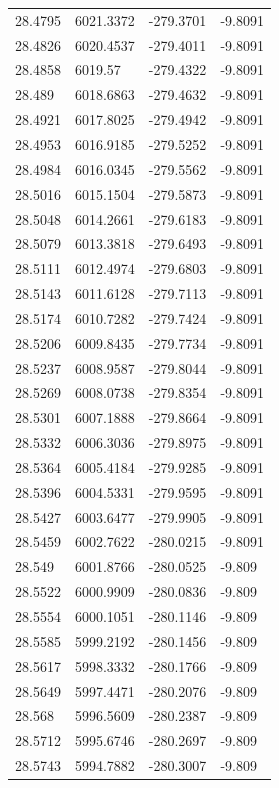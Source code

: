 \begin{table}[H]
\begin{tabular}{llll}
28.4795 & 6021.3372 & -279.3701 & -9.8091 \\
28.4826 & 6020.4537 & -279.4011 & -9.8091 \\
28.4858 & 6019.57 & -279.4322 & -9.8091 \\
28.489 & 6018.6863 & -279.4632 & -9.8091 \\
28.4921 & 6017.8025 & -279.4942 & -9.8091 \\
28.4953 & 6016.9185 & -279.5252 & -9.8091 \\
28.4984 & 6016.0345 & -279.5562 & -9.8091 \\
28.5016 & 6015.1504 & -279.5873 & -9.8091 \\
28.5048 & 6014.2661 & -279.6183 & -9.8091 \\
28.5079 & 6013.3818 & -279.6493 & -9.8091 \\
28.5111 & 6012.4974 & -279.6803 & -9.8091 \\
28.5143 & 6011.6128 & -279.7113 & -9.8091 \\
28.5174 & 6010.7282 & -279.7424 & -9.8091 \\
28.5206 & 6009.8435 & -279.7734 & -9.8091 \\
28.5237 & 6008.9587 & -279.8044 & -9.8091 \\
28.5269 & 6008.0738 & -279.8354 & -9.8091 \\
28.5301 & 6007.1888 & -279.8664 & -9.8091 \\
28.5332 & 6006.3036 & -279.8975 & -9.8091 \\
28.5364 & 6005.4184 & -279.9285 & -9.8091 \\
28.5396 & 6004.5331 & -279.9595 & -9.8091 \\
28.5427 & 6003.6477 & -279.9905 & -9.8091 \\
28.5459 & 6002.7622 & -280.0215 & -9.8091 \\
28.549 & 6001.8766 & -280.0525 & -9.809 \\
28.5522 & 6000.9909 & -280.0836 & -9.809 \\
28.5554 & 6000.1051 & -280.1146 & -9.809 \\
28.5585 & 5999.2192 & -280.1456 & -9.809 \\
28.5617 & 5998.3332 & -280.1766 & -9.809 \\
28.5649 & 5997.4471 & -280.2076 & -9.809 \\
28.568 & 5996.5609 & -280.2387 & -9.809 \\
28.5712 & 5995.6746 & -280.2697 & -9.809 \\
28.5743 & 5994.7882 & -280.3007 & -9.809 \\

\end{tabular}
\end{table}
